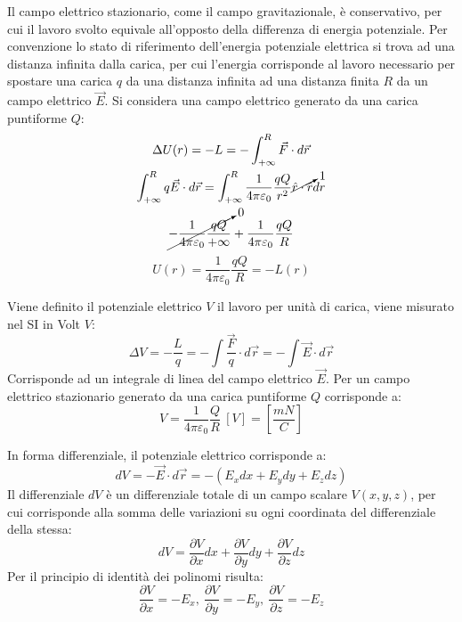 \documentclass{article}
\numberwithin{equation}{subsection}
\begin{document}
Il campo elettrico stazionario, come il campo gravitazionale, è conservativo, per cui il lavoro svolto equivale all'opposto della differenza di energia potenziale. Per 
convenzione lo stato di riferimento dell'energia potenziale elettrica si trova ad una distanza infinita dalla carica, per cui l'energia corrisponde al lavoro necessario per 
spostare una carica $q$ da una distanza infinita ad una distanza finita $R$ da un campo elettrico $\vec{E}$. Si considera una campo elettrico generato da una carica puntiforme 
$Q$:
\begin{gather*}
    \Delta U(r)=-L=-\displaystyle\int_{+\infty}^R\vec{F}\cdot d\vec{r}\\
    \displaystyle\int_{+\infty}^Rq\vec{E}\cdot d\vec{r}=\int_{+\infty}^R\frac{1}{4\pi\varepsilon_0}\frac{qQ}{r^2}\cancelto{1}{\hat{r}\cdot \hat{r}}dr\\
    \cancelto{0}{-\displaystyle\frac{1}{4\pi\varepsilon_0}\frac{qQ}{+\infty}}+\frac{1}{4\pi\varepsilon_0}\frac{qQ}{R}
\end{gather*}
\begin{equation}
    U(r)=\frac{1}{4\pi\varepsilon_0}\frac{qQ}{R}=-L(r)
\end{equation}


Viene definito il potenziale elettrico $V$ il lavoro per unità di carica, viene misurato nel SI in Volt $V$:
\begin{equation}
    \Delta V=\displaystyle-\frac{L}{q}=-\int\frac{\vec{F}}{q}\cdot d\vec{r}=-\int\vec{E}\cdot d\vec{r}
\end{equation}
Corrisponde ad un integrale di linea del campo elettrico $\vec{E}$. 
Per un campo elettrico stazionario generato da una carica puntiforme $Q$ corrisponde a:
\begin{equation}
    V=\displaystyle\frac{1}{4\pi\varepsilon_0}\frac{Q}{R}\:\left[V\right]=\left[\frac{mN}{C}\right]
\end{equation}

In forma differenziale, il potenziale elettrico corrisponde a:
\begin{equation*}
    dV=-\vec{E}\cdot d\vec{r}=-(E_xdx+E_ydy+E_zdz)
\end{equation*}
Il differenziale $dV$ è un differenziale totale di un campo scalare $V(x,y,z)$, per cui corrisponde alla somma delle variazioni su ogni coordinata del differenziale della stessa: 
\begin{equation*}
    dV=\displaystyle\frac{\partial V}{\partial x}dx+\frac{\partial V}{\partial y}dy+\frac{\partial V}{\partial z}dz
\end{equation*}
Per il principio di identità dei polinomi risulta:
\begin{equation*}
    \displaystyle\frac{\partial V}{\partial x}=-E_x,\:\frac{\partial V}{\partial y}=-E_y,\:\frac{\partial V}{\partial z}=-E_z
\end{equation*}
\end{document}
